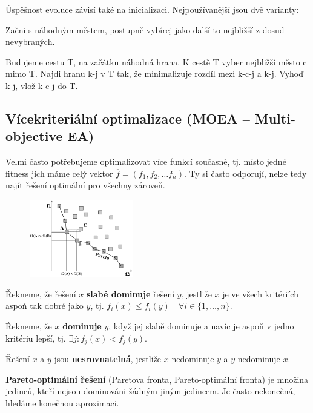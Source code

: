 Úspěšnost evoluce závisí také na inicializaci. Nejpoužívanější jsou dvě varianty:
\begin{description}
	\leftskip 40pt
	\setlength{\itemsep}{0pt}
	\item[nejbližší sousedi] Začni s náhodným městem, postupně vybírej jako další to nejbližší z dosud nevybraných.
	\item[vkládání hran] Budujeme cestu T, na začátku náhodná hrana. K cestě T vyber nejbližší město c mimo T. Najdi hranu k-j v T tak, že minimalizuje rozdíl mezi k-c-j a k-j. Vyhoď k-j, vlož k-c-j do T.
\end{description}

\subsection{Vícekriteriální optimalizace (MOEA -- Multi-objective EA)}
Velmi často potřebujeme optimalizovat více funkcí současně, tj. místo jedné fitness jich máme celý vektor $\overline{f} = (f_1, f_2, \dots f_n)$. Ty si často odporují, nelze tedy najít řešení optimální pro všechny zároveň.

\begin{figure}
	\centering
	
	\includegraphics[width=0.4\textwidth]{img/pareto.png}
\end{figure}

Řekneme, že řešení $x$ \textbf{slabě dominuje} řešení $y$, jestliže $x$ je ve všech kritériích aspoň tak dobré jako $y$, tj. $f_i(x) \leq f_i(y)\quad \forall i \in \{1,\dots,n\}$. 

Řekneme, že $x$ \textbf{dominuje} $y$, když jej slabě dominuje a navíc je aspoň v jedno kritériu lepší, tj. $\exists j: f_j(x) < f_j(y)$. 

Řešení $x$ a $y$ jsou \textbf{nesrovnatelná}, jestliže $x$ nedominuje $y$ a $y$ nedominuje $x$.

\textbf{Pareto-optimální řešení} (Paretova fronta, Pareto-optimální fronta) je množina jedinců, kteří nejsou dominováni žádným jiným jedincem. Je často nekonečná, hledáme konečnou aproximaci.

